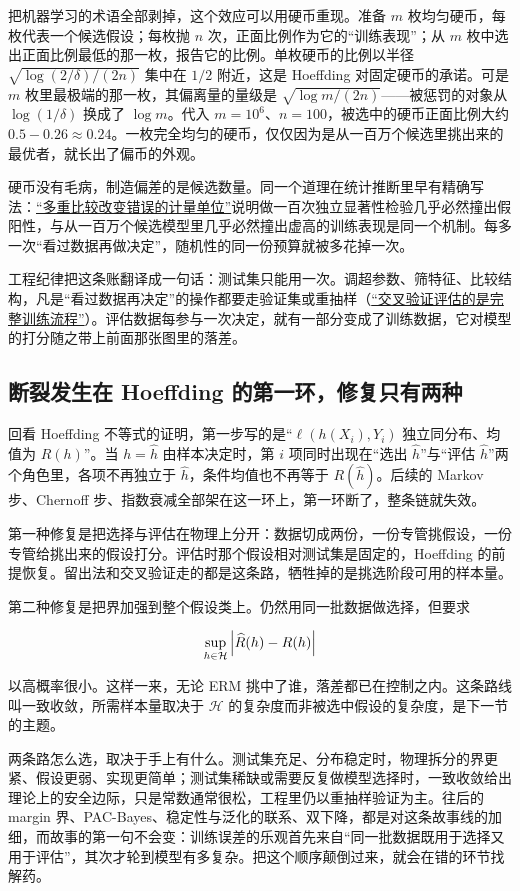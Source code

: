 把机器学习的术语全部剥掉，这个效应可以用硬币重现。准备 \(m\) 枚均匀硬币，每枚代表一个候选假设；每枚抛 \(n\) 次，正面比例作为它的``训练表现''；从 \(m\) 枚中选出正面比例最低的那一枚，报告它的比例。单枚硬币的比例以半径 \(\sqrt{\log(2/\delta)/(2n)}\) 集中在 \(1/2\) 附近，这是 Hoeffding 对固定硬币的承诺。可是 \(m\) 枚里最极端的那一枚，其偏离量的量级是 \(\sqrt{\log m/(2n)}\)——被惩罚的对象从 \(\log(1/\delta)\) 换成了 \(\log m\)。代入 \(m = 10^6\)、\(n = 100\)，被选中的硬币正面比例大约 \(0.5 - 0.26 \approx 0.24\)。一枚完全均匀的硬币，仅仅因为是从一百万个候选里挑出来的最优者，就长出了偏币的外观。

硬币没有毛病，制造偏差的是候选数量。同一个道理在统计推断里早有精确写法：\hyperref[sec:11-Mathematical-Statistics/05-Hypothesis-Testing/04]{``多重比较改变错误的计量单位''}说明做一百次独立显著性检验几乎必然撞出假阳性，与从一百万个候选模型里几乎必然撞出虚高的训练表现是同一个机制。每多一次``看过数据再做决定''，随机性的同一份预算就被多花掉一次。

工程纪律把这条账翻译成一句话：测试集只能用一次。调超参数、筛特征、比较结构，凡是``看过数据再决定''的操作都要走验证集或重抽样（\hyperref[sec:11-Mathematical-Statistics/06-Resampling-and-Model-Selection/03]{``交叉验证评估的是完整训练流程''}）。评估数据每参与一次决定，就有一部分变成了训练数据，它对模型的打分随之带上前面那张图里的落差。

\subsection{断裂发生在 Hoeffding 的第一环，修复只有两种}

回看 Hoeffding 不等式的证明，第一步写的是``\(\ell(h(X_i), Y_i)\) 独立同分布、均值为 \(R(h)\)''。当 \(h = \widehat h\) 由样本决定时，第 \(i\) 项同时出现在``选出 \(\widehat h\)''与``评估 \(\widehat h\)''两个角色里，各项不再独立于 \(\widehat h\)，条件均值也不再等于 \(R(\widehat h)\)。后续的 Markov 步、Chernoff 步、指数衰减全部架在这一环上，第一环断了，整条链就失效。

第一种修复是把选择与评估在物理上分开：数据切成两份，一份专管挑假设，一份专管给挑出来的假设打分。评估时那个假设相对测试集是固定的，Hoeffding 的前提恢复。留出法和交叉验证走的都是这条路，牺牲掉的是挑选阶段可用的样本量。

第二种修复是把界加强到整个假设类上。仍然用同一批数据做选择，但要求

\[
\sup_{h \in \mathcal{H}} \left|\widehat R(h) - R(h)\right|
\]

以高概率很小。这样一来，无论 ERM 挑中了谁，落差都已在控制之内。这条路线叫一致收敛，所需样本量取决于 \(\mathcal{H}\) 的复杂度而非被选中假设的复杂度，是下一节的主题。

两条路怎么选，取决于手上有什么。测试集充足、分布稳定时，物理拆分的界更紧、假设更弱、实现更简单；测试集稀缺或需要反复做模型选择时，一致收敛给出理论上的安全边际，只是常数通常很松，工程里仍以重抽样验证为主。往后的 margin 界、PAC-Bayes、稳定性与泛化的联系、双下降，都是对这条故事线的加细，而故事的第一句不会变：训练误差的乐观首先来自``同一批数据既用于选择又用于评估''，其次才轮到模型有多复杂。把这个顺序颠倒过来，就会在错的环节找解药。
